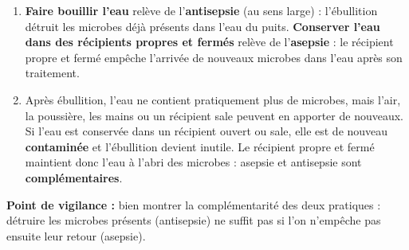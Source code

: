 \documentclass[11pt]{article}
\begin{document}
\begin{corrige}
\begin{enumerate}
\item \textbf{Faire bouillir l'eau} relève de l'\textbf{antisepsie} (au sens large) : l'ébullition détruit les microbes déjà présents dans l'eau du puits. \textbf{Conserver l'eau dans des récipients propres et fermés} relève de l'\textbf{asepsie} : le récipient propre et fermé empêche l'arrivée de nouveaux microbes dans l'eau après son traitement.
\item Après ébullition, l'eau ne contient pratiquement plus de microbes, mais l'air, la poussière, les mains ou un récipient sale peuvent en apporter de nouveaux. Si l'eau est conservée dans un récipient ouvert ou sale, elle est de nouveau \textbf{contaminée} et l'ébullition devient inutile. Le récipient propre et fermé maintient donc l'eau à l'abri des microbes : asepsie et antisepsie sont \textbf{complémentaires}.
\end{enumerate}
\textbf{Point de vigilance :} bien montrer la complémentarité des deux pratiques : détruire les microbes présents (antisepsie) ne suffit pas si l'on n'empêche pas ensuite leur retour (asepsie).
\end{corrige}
\end{document}

